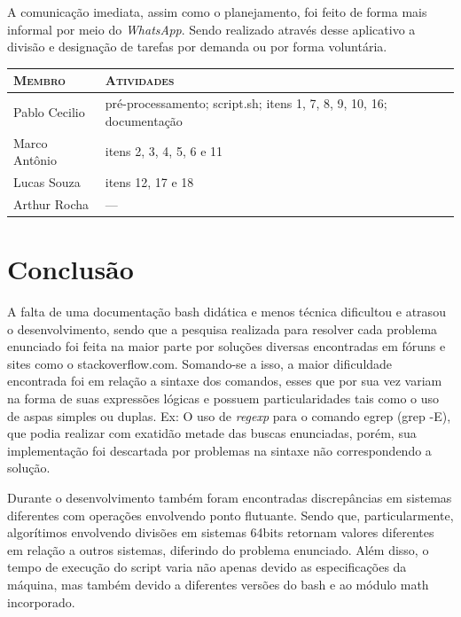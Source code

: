 \documentclass[12pt]{article}
\begin{document}
A comunicação imediata, assim como o planejamento, foi feito de forma mais informal por meio do \textit{WhatsApp}. Sendo realizado através desse aplicativo a divisão e designação de tarefas por demanda ou por forma voluntária.

\begin{table}[!h]
    \begin{tabular}{p{5cm}p{7.5cm}}
    
        \textsc{Membro}      & \textsc{Atividades} \\ 
	    \hline
        Pablo Cecilio & pré-processamento; script.sh; itens 1, 7, 8, 9, 10, 16; documentação \\ 
        Marco Antônio & itens 2, 3, 4, 5, 6 e 11 \\
        Lucas Souza & itens 12, 17 e 18 \\
        Arthur Rocha & --- \\

    \end{tabular}
\end{table}

\pagebreak

\section{Conclusão}

A falta de uma documentação bash didática e menos técnica dificultou e atrasou o desenvolvimento, sendo que a pesquisa realizada para resolver cada problema enunciado  foi feita na maior parte por soluções diversas encontradas em fóruns e sites como o stackoverflow.com. Somando-se a isso, a maior dificuldade encontrada foi em relação a sintaxe dos comandos, esses que por sua vez variam na forma de suas expressões lógicas e possuem particularidades tais como o uso de aspas simples ou duplas. Ex: O uso de \textit{regexp} para o comando egrep (grep -E), que podia realizar com exatidão metade das buscas enunciadas, porém, sua implementação foi descartada por problemas na sintaxe não correspondendo a solução.

Durante o desenvolvimento também foram encontradas discrepâncias em sistemas diferentes com operações envolvendo ponto flutuante. Sendo que, particularmente, algorítimos envolvendo divisões em sistemas 64bits retornam valores diferentes em relação a outros sistemas, diferindo do problema enunciado. Além disso, o tempo de execução do script varia não apenas devido as especificações da máquina, mas também devido a diferentes versões do bash e ao módulo math incorporado.
\end{document}
